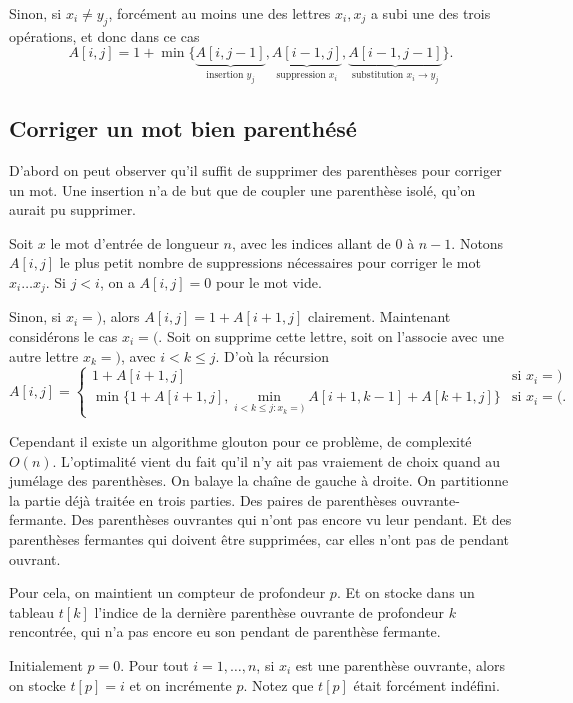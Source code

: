 \documentclass[12pt]{article}
\begin{document}
Sinon, si $x_i\neq y_j$, forcément au moins une des lettres $x_i,x_j$ a subi une des trois opérations, et donc dans ce cas
\[
A[i,j] = 1 + \min\{ \underbrace{A[ i,j-1 ]}_{\textrm{insertion $y_j$}}, 
 \underbrace{A[i-1,j]}_{\textrm{suppression $x_i$}}, 
 \underbrace{A[i-1,j-1]}_{\textrm{substitution $x_i \rightarrow y_j$}} \}.
\]

\subsection{Corriger un mot bien parenthésé}

D'abord on peut observer qu'il suffit de supprimer des parenthèses pour
corriger un mot. Une insertion n'a de but que de coupler une parenthèse isolé,
qu'on aurait pu supprimer.

Soit $x$ le mot d'entrée de longueur $n$, avec les indices allant de $0$ à $n-1$.
Notons $A[i,j]$ le plus petit nombre de suppressions nécessaires pour corriger le mot $x_i\ldots x_j$.  
Si $j<i$, on a $A[i,j]=0$ pour le mot vide.

Sinon, si $x_i=)$, alors $A[i,j]=1+A[i+1,j]$ clairement.
Maintenant considérons le cas $x_i=($.  Soit on supprime cette lettre, soit on l'associe avec une autre lettre $x_k=)$, avec $i<k\leq j$. D'où la récursion
\[
A[i,j] = 
\left\{
    \begin{array}{ll}
    1 + A[i+1,j] & \textrm{si } x_i=\textrm{)}
    \\
    \min\{1+A[i+1,j], \min_{i<k\leq j:x_k=)} A[i+1,k-1]+A[k+1,j]\} & \textrm{si } x_i=\textrm{(}.
    \end{array}
\right.
\]

Cependant il existe un algorithme glouton pour ce problème, de complexité
$O(n)$.  L'optimalité
vient du fait qu'il n'y ait pas vraiement de choix quand au jumélage des
parenthèses. On balaye la chaîne de gauche à droite.  On partitionne la partie
déjà traitée en trois parties. Des paires de parenthèses ouvrante-fermante. Des
parenthèses ouvrantes qui n'ont pas encore vu leur pendant. Et des parenthèses
fermantes qui doivent être supprimées, car elles n'ont pas de pendant ouvrant.

Pour cela, on maintient un compteur de profondeur $p$. Et on stocke dans un
tableau $t[k]$ l'indice de la dernière parenthèse ouvrante de profondeur $k$
rencontrée, qui n'a pas encore eu son pendant de parenthèse fermante.

Initialement $p=0$. Pour tout $i=1,\ldots,n$, si $x_i$ est une parenthèse
ouvrante, alors on stocke $t[p]=i$ et on incrémente $p$.  Notez que $t[p]$
était forcément indéfini.
\end{document}
